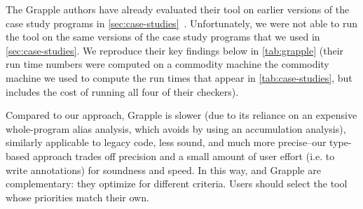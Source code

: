 The Grapple authors have already evaluated their tool on earlier
versions of the case study programs in
\cref{sec:case-studies}~\cite{zuo2019grapple}.  Unfortunately, we were
not able to run the tool on the same versions of the case study
programs that we used in \cref{sec:case-studies}.
We reproduce their key findings below in \cref{tab:grapple}
(their run time numbers were computed on a commodity machine
 the commodity machine we used to compute the run
times that appear in \cref{tab:case-studies}, but includes the cost
of running all four of their checkers).

Compared to our approach, Grapple is slower (due to its reliance on
an expensive whole-program alias analysis, which \Tool avoids by using
an accumulation analysis), similarly applicable to legacy
code, less sound, and much more precise--our type-based approach
trades off precision and a small amount of user effort (i.e. to write annotations)
for soundness and speed. In this way, \Tool and Grapple are complementary:
they optimize for different criteria. Users should select the tool whose
priorities match their own.


